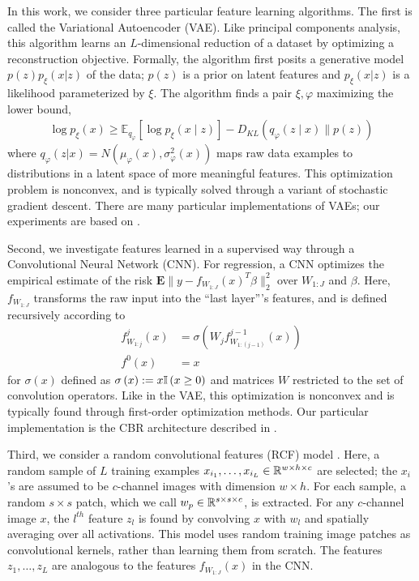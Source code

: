 In this work, we consider three particular feature learning algorithms. The
first is called the Variational Autoencoder (VAE). Like principal components
analysis, this algorithm learns an $L$-dimensional reduction of a dataset by
optimizing a reconstruction objective. Formally, the algorithm first posits a
generative model $p\left(z\right)p_{\xi}\left(x \vert z\right)$ of the data;
$p\left(z\right)$ is a prior on latent features and $p_{\xi}\left(x \vert
z\right)$ is a likelihood parameterized by $\xi$. The algorithm finds a pair
$\xi, \varphi$ maximizing the lower bound,
\begin{align*}
\log p_{\xi}\left(x\right) \geq  \mathbb{E}_{q_{\varphi}}\left[\log p_{\xi}(x \mid z)\right]-D_{KL}\left(q_{\varphi}(z \mid x) \| p(z)\right)
\end{align*}
where $q_{\varphi}\left(z \vert x\right) = N\left(\mu_{\varphi}\left(x\right),
\sigma^{2}_{\varphi}\left(x\right)\right)$ maps raw data examples to
distributions in a latent space of more meaningful features. This optimization
problem is nonconvex, and is typically solved through a variant of stochastic
gradient descent. There are many particular implementations of VAEs; our
experiments are based on \citep{van2017neural}.

Second, we investigate features learned in a supervised way through a
Convolutional Neural Network (CNN). For regression, a CNN optimizes the
empirical estimate of the risk $\mathbf{E}\|y -
f_{W_{1:J}}\left(x\right)^{T}\beta\|_{2}^{2}$ over $W_{1:J}$ and $\beta$. Here,
$f_{W_{1:J}}$ transforms the raw input into the ``last layer''’s features, and
is defined recursively according to
\begin{align*}
f^{j}_{W_{1:j}}\left(x\right) &= \sigma\left(W_{j}f^{j - 1}_{W_{1:(j - 1)}}\left(x\right)\right)\\
f^{0}\left(x\right) &= x
\end{align*}
for $\sigma\left(x\right)$ defined as $\sigma\left(x\right) := x \mathbb{I}\left({x \geq
  0}\right)$ and matrices $W$ restricted to the set of convolution operators. Like in
the VAE, this optimization is nonconvex and is typically found through
first-order optimization methods. Our particular implementation is the CBR
architecture described in \citep{raghu2017svcca}.

Third, we consider a random convolutional features (RCF) model
\citep{rahimi2008weighted}. Here, a random sample of $L$ training examples
$x_{i_1}, \dots, x_{i_L} \in \mathbb{R}^{w \times h \times c}$ are selected; the
$x_{i}$'s are assumed to be $c$-channel images with dimension $w\times h$. For
each sample, a random $s \times s$ patch, which we call $w_{p} \in \mathbb{R}^{s
  \times s \times c}$, is extracted. For any $c$-channel image $x$, the $l^{th}$
feature $z_{l}$ is found by convolving $x$ with $w_{l}$ and spatially averaging
over all activations. This model uses random training image patches as
convolutional kernels, rather than learning them from scratch. The features
$z_{1}, \dots, z_{L}$ are analogous to the features $f_{W_{1:J}}\left(x\right)$
in the CNN.

